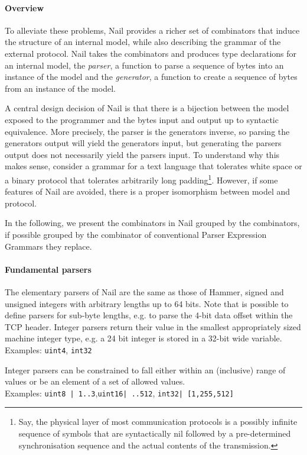 \documentclass[10pt]{article}
\begin{document}
\paragraph{Overview}
To alleviate these problems, Nail provides a richer set of combinators that induce the structure of
an internal model, while also describing the grammar of the external protocol. Nail takes the
combinators and produces type declarations for an internal model, the \textit{parser}, a function to parse a sequence of
bytes into an instance of the model and the \textit{generator}, a function to create a sequence of
bytes from an instance of the model.

A central design decision of Nail is that there is a  bijection between the model exposed to the programmer and the bytes
input and output up to syntactic equivalence. More precisely, the parser is the generators inverse,
so parsing the generators output will yield the generators input, but generating the parsers output
does not necessarily yield the parsers input. To understand why this makes sense, consider a grammar
for a text language that tolerates white space or a binary protocol that tolerates arbitrarily long
padding\footnote{Say, the physical layer of most communication protocols is a possibly infinite
  sequence of symbols that are syntactically nil followed by a pre-determined synchronisation
  sequence and the actual contents of the transmission.}. However, if some features of Nail are
avoided, there is a proper isomorphism between model and protocol.

In the following, we present the combinators in Nail grouped by the combinators, if possible grouped
by the combinator of conventional Parser Expression Grammars they replace.
\paragraph{Fundamental parsers}
The elementary parsers of Nail are the same as those of Hammer, signed and unsigned integers with
arbitrary lengths up to 64 bits. Note that is possible to define parsers for sub-byte lengths, e.g.
to parse the 4-bit data offset within the TCP header. Integer parsers return their value in the
smallest appropriately sized machine integer type, e.g. a 24 bit integer is stored in a 32-bit wide variable.\\
Examples: \texttt{uint4}, \texttt{int32}

Integer parsers can be constrained to fall either within an (inclusive) range of values or be an
element of a set of allowed values. \\Examples: \texttt{uint8 | 1..3},\texttt{uint16| ..512},
\texttt{int32| [1,255,512]}
\end{document}
